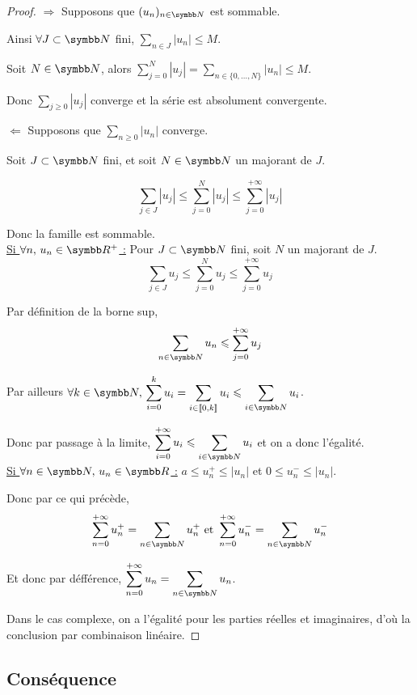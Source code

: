 \begin{proof}
    $\Rightarrow$ Supposons que $(u_n)_{n \in \N}$ est sommable. 

    Ainsi $\forall J \subset \N$ fini, $\displaystyle \sum_{n \in J} |u_n| \leqslant M$.

    Soit $N \in \N$, alors $\displaystyle \sum_{j = 0 }^N |u_j|  = \sum_{n \in \{0, \ldots, N\}} |u_n| \leqslant M$.

    Donc $\sum_{j \geqslant 0} |u_j|$ converge et la série est absolument convergente. 

    \lvspace $\Leftarrow$ Supposons que $\sum_{n \geqslant 0} |u_n|$ converge. 

    Soit $J \subset \N$ fini, et soit $N \in \N$ un majorant de $J$. 

    \[\sum_{j \in J} |u_j| \leqslant \sum_{j = 0}^N |u_j| \leqslant \sum_{j = 0}^{+\infty} |u_j|\]

    Donc la famille est sommable. \\

    \uline{Si $\forall n, \, u_n \in \R^+$ :}
    Pour $J \subset \N$ fini, soit $N$ un majorant de $J$. 
    \[\sum_{j \in J} u_j \leqslant \sum_{j = 0}^N u_j \leqslant \sum_{j = 0}^{+\infty} u_j\]

    Par définition de la borne sup, 
    \[\sum_{n \in \N} u_n \leqslant \sum_{j = 0 }^{+\infty} u_j\]

    Par ailleurs $\forall k \in \N, \, \displaystyle \sum_{i = 0}^k u_i  = \sum_{i \in \ninter 0 k} u_i \leqslant \sum_{i \in \N} u_i$.

    Donc par passage à la limite, $\displaystyle \sum_{i = 0}^{+\infty} u_i \leqslant \sum_{i \in \N} u_i$ et on a donc l'égalité. \\

    \uline{Si $\forall n \in \N, \, u_n \in \R$ :}
    $a \leqslant u_n^+ \leqslant |u_n|$ et $0 \leqslant u_n^- \leqslant |u_n|$.

    Donc par ce qui précède, 
    \[\sum_{n = 0}^{+ \infty} u_n^+ = \sum_{n \in \N} u_n^+ \text{ et } \sum_{n = 0}^{+\infty} u_n^- = \sum_{n \in \N} u_n^-\]

    Et donc par défférence, $\displaystyle \sum_{n = 0}^{+\infty} u_n = \sum_{n \in \N} u_n$.

    Dans le cas complexe, on a l'égalité pour les parties réelles et imaginaires, d'où la conclusion 
    par combinaison linéaire. 
\end{proof}

\subsection{Conséquence}

